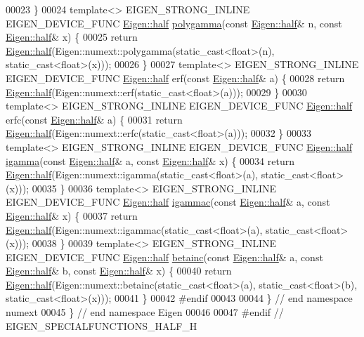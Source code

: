 \begin{DoxyCode}
00023 \}
00024 \textcolor{keyword}{template}<> EIGEN\_STRONG\_INLINE EIGEN\_DEVICE\_FUNC \hyperlink{struct_eigen_1_1half}{Eigen::half} 
      \hyperlink{namespace_eigen_ae3b47a13a0699f5dbaa0623c11333dca}{polygamma}(\textcolor{keyword}{const} \hyperlink{struct_eigen_1_1half}{Eigen::half}& n, \textcolor{keyword}{const} \hyperlink{struct_eigen_1_1half}{Eigen::half}& x) \{
00025   \textcolor{keywordflow}{return} \hyperlink{struct_eigen_1_1half}{Eigen::half}(Eigen::numext::polygamma(static\_cast<float>(n), static\_cast<float>(x)));
00026 \}
00027 \textcolor{keyword}{template}<> EIGEN\_STRONG\_INLINE EIGEN\_DEVICE\_FUNC \hyperlink{struct_eigen_1_1half}{Eigen::half} erf(\textcolor{keyword}{const} 
      \hyperlink{struct_eigen_1_1half}{Eigen::half}& a) \{
00028   \textcolor{keywordflow}{return} \hyperlink{struct_eigen_1_1half}{Eigen::half}(Eigen::numext::erf(static\_cast<float>(a)));
00029 \}
00030 \textcolor{keyword}{template}<> EIGEN\_STRONG\_INLINE EIGEN\_DEVICE\_FUNC \hyperlink{struct_eigen_1_1half}{Eigen::half} erfc(\textcolor{keyword}{const} 
      \hyperlink{struct_eigen_1_1half}{Eigen::half}& a) \{
00031   \textcolor{keywordflow}{return} \hyperlink{struct_eigen_1_1half}{Eigen::half}(Eigen::numext::erfc(static\_cast<float>(a)));
00032 \}
00033 \textcolor{keyword}{template}<> EIGEN\_STRONG\_INLINE EIGEN\_DEVICE\_FUNC \hyperlink{struct_eigen_1_1half}{Eigen::half} \hyperlink{namespace_eigen_af5aa651137636b1cdbd27de1cfe91148}{igamma}(\textcolor{keyword}{const} 
      \hyperlink{struct_eigen_1_1half}{Eigen::half}& a, \textcolor{keyword}{const} \hyperlink{struct_eigen_1_1half}{Eigen::half}& x) \{
00034   \textcolor{keywordflow}{return} \hyperlink{struct_eigen_1_1half}{Eigen::half}(Eigen::numext::igamma(static\_cast<float>(a), static\_cast<float>(x)));
00035 \}
00036 \textcolor{keyword}{template}<> EIGEN\_STRONG\_INLINE EIGEN\_DEVICE\_FUNC \hyperlink{struct_eigen_1_1half}{Eigen::half} \hyperlink{namespace_eigen_a1abaa2ff8c7b1871eaf026a47c6bbf3b}{igammac}(\textcolor{keyword}{const} 
      \hyperlink{struct_eigen_1_1half}{Eigen::half}& a, \textcolor{keyword}{const} \hyperlink{struct_eigen_1_1half}{Eigen::half}& x) \{
00037   \textcolor{keywordflow}{return} \hyperlink{struct_eigen_1_1half}{Eigen::half}(Eigen::numext::igammac(static\_cast<float>(a), static\_cast<float>(x)));
00038 \}
00039 \textcolor{keyword}{template}<> EIGEN\_STRONG\_INLINE EIGEN\_DEVICE\_FUNC \hyperlink{struct_eigen_1_1half}{Eigen::half} \hyperlink{namespace_eigen_a726eae91d4e91d8e25cbe55fffa6a92f}{betainc}(\textcolor{keyword}{const} 
      \hyperlink{struct_eigen_1_1half}{Eigen::half}& a, \textcolor{keyword}{const} \hyperlink{struct_eigen_1_1half}{Eigen::half}& b, \textcolor{keyword}{const} \hyperlink{struct_eigen_1_1half}{Eigen::half}& x) \{
00040   \textcolor{keywordflow}{return} \hyperlink{struct_eigen_1_1half}{Eigen::half}(Eigen::numext::betainc(static\_cast<float>(a), static\_cast<float>(b), 
      static\_cast<float>(x)));
00041 \}
00042 \textcolor{preprocessor}{#endif}
00043 
00044 \}  \textcolor{comment}{// end namespace numext}
00045 \}  \textcolor{comment}{// end namespace Eigen}
00046 
00047 \textcolor{preprocessor}{#endif  // EIGEN\_SPECIALFUNCTIONS\_HALF\_H}
\end{DoxyCode}
